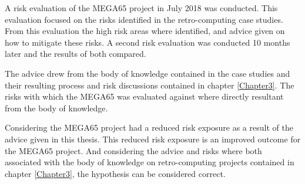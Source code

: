 A risk evaluation of the MEGA65 project in July 2018 was conducted. This evaluation focused on the risks identified in the retro-computing case studies. From this evaluation the high risk areas where identified, and advice given on how to mitigate these risks. A second risk evaluation was conducted 10 months later and the results of both compared.

The advice drew from the body of knowledge contained in the case studies and their resulting process and risk discussions contained in chapter \ref{Chapter3}. The risks with which the MEGA65 was evaluated against where directly resultant from the body of knowledge. 

Considering the MEGA65 project had a reduced risk exposure as a result of the advice given in this thesis. This reduced risk exposure is an improved outcome for the MEGA65 project. And considering the advice and risks where both associated with the body of knowledge on retro-computing projects contained in chapter \ref{Chapter3}, the hypothesis can be considered correct.